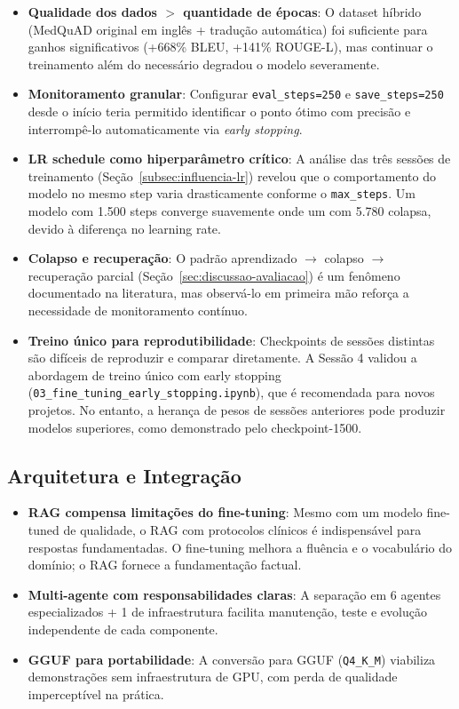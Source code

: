 \begin{itemize}
    \item \textbf{Qualidade dos dados $>$ quantidade de épocas}: O dataset híbrido (MedQuAD original em inglês + tradução automática) foi suficiente para ganhos significativos (+668\% BLEU, +141\% ROUGE-L), mas continuar o treinamento além do necessário degradou o modelo severamente.

    \item \textbf{Monitoramento granular}: Configurar \texttt{eval\_steps=250} e \texttt{save\_steps=250} desde o início teria permitido identificar o ponto ótimo com precisão e interrompê-lo automaticamente via \textit{early stopping}.

    \item \textbf{LR schedule como hiperparâmetro crítico}: A análise das três sessões de treinamento (Seção~\ref{subsec:influencia-lr}) revelou que o comportamento do modelo no mesmo step varia drasticamente conforme o \texttt{max\_steps}. Um modelo com 1.500 steps converge suavemente onde um com 5.780 colapsa, devido à diferença no learning rate.

    \item \textbf{Colapso e recuperação}: O padrão aprendizado $\rightarrow$ colapso $\rightarrow$ recuperação parcial (Seção~\ref{sec:discussao-avaliacao}) é um fenômeno documentado na literatura, mas observá-lo em primeira mão reforça a necessidade de monitoramento contínuo.

    \item \textbf{Treino único para reprodutibilidade}: Checkpoints de sessões distintas são difíceis de reproduzir e comparar diretamente. A Sessão 4 validou a abordagem de treino único com early stopping (\texttt{03\_fine\_tuning\_early\_stopping.ipynb}), que é recomendada para novos projetos. No entanto, a herança de pesos de sessões anteriores pode produzir modelos superiores, como demonstrado pelo checkpoint-1500.
\end{itemize}

\subsection{Arquitetura e Integração}

\begin{itemize}
    \item \textbf{RAG compensa limitações do fine-tuning}: Mesmo com um modelo fine-tuned de qualidade, o RAG com protocolos clínicos é indispensável para respostas fundamentadas. O fine-tuning melhora a fluência e o vocabulário do domínio; o RAG fornece a fundamentação factual.

    \item \textbf{Multi-agente com responsabilidades claras}: A separação em 6 agentes especializados + 1 de infraestrutura facilita manutenção, teste e evolução independente de cada componente.

    \item \textbf{GGUF para portabilidade}: A conversão para GGUF (\texttt{Q4\_K\_M}) viabiliza demonstrações sem infraestrutura de GPU, com perda de qualidade imperceptível na prática.
\end{itemize}

